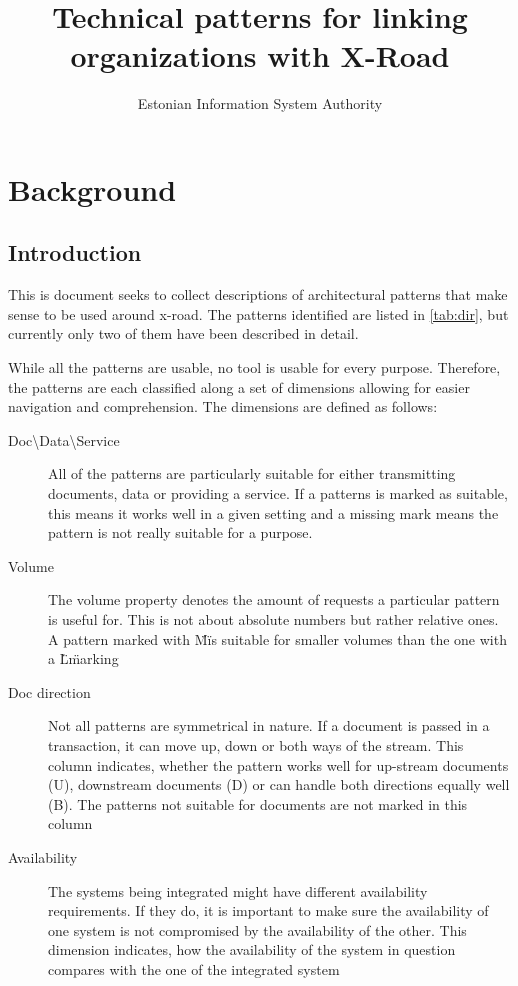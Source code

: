 \documentclass[10pt,a4paper]{article}
\title{Technical patterns for linking organizations with X-Road}
\author{Estonian Information System Authority}
\begin{document}
\maketitle
\clearpage
\setcounter{tocdepth}{2}
\tableofcontents
\clearpage

\section{Background}
\subsection{Introduction}
This is document seeks to collect descriptions of architectural patterns that make sense to be used around x-road. The patterns identified are listed in \ref{tab:dir}, but currently only two of them have been described in detail.

While all the patterns are usable, no tool is usable for every purpose. Therefore, the patterns are each classified along a set of dimensions allowing for easier navigation and comprehension. The dimensions are defined as follows:
\begin{description}
	\item[Doc\textbackslash Data\textbackslash Service] All of the patterns are particularly suitable for either transmitting documents, data or providing a service. If a patterns is marked as suitable, this means it works well in a given setting and a missing mark means the pattern is not really suitable for a purpose. 
	\item[Volume] The volume property denotes the amount of requests a particular pattern is useful for. This is not about absolute numbers but rather relative ones. A pattern marked with \"M\" is suitable for smaller volumes than the one with a \"L\" marking
	\item[Doc direction] Not all patterns are symmetrical in nature. If a document is passed in a transaction, it can move up, down or both ways of the stream. This column indicates, whether the pattern works well for up-stream documents (U), downstream documents (D) or can handle both directions equally well (B). The patterns not suitable for documents are not marked in this column
	 \item[Availability] The systems being integrated might have different availability requirements. If they do, it is important to make sure the availability of one system is not compromised by the availability of the other. This dimension indicates, how the availability of the system in question compares with the one of the integrated system
\end{description}
\end{document}
